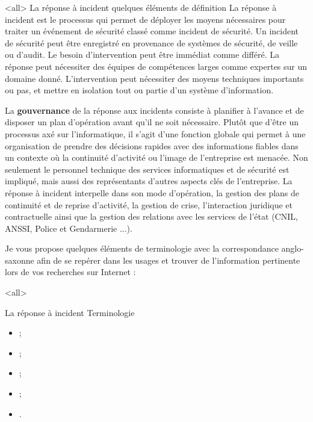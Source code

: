 \mode<all>{\texframe
{La réponse à incident}
{quelques éléments de définition}
{%
La réponse à incident est le processus qui permet de déployer les moyens nécessaires pour traiter un événement de sécurité classé comme incident de sécurité.
Un incident de sécurité peut être enregistré en provenance de systèmes de sécurité, de veille ou d'audit. Le besoin d'intervention peut être immédiat comme différé.
La réponse peut nécessiter des équipes de compétences larges comme expertes sur un domaine donné. L'intervention peut nécessiter des moyens techniques importants ou pas, et mettre en isolation tout ou partie d'un système d'information.
}} %




La \textbf{gouvernance} de la réponse aux incidents consiste à planifier à l'avance et  de disposer un plan d'opération avant qu'il ne soit nécessaire. Plutôt que d'être un processus axé sur l'informatique, il s'agit d'une fonction  globale qui permet à une organisation de prendre des décisions rapides avec des informations fiables dans un contexte où la continuité d'activité ou l'image de l'entreprise est menacée. Non seulement le personnel technique des services informatiques et de sécurité est impliqué, mais aussi des représentants d'autres aspects clés de l'entreprise. La réponse à incident  interpelle  dans son mode d'opération, la gestion des plans de continuité et de reprise d'activité, la gestion de crise,  l'interaction juridique et contractuelle  ainsi que la gestion des relations avec les services de l'état (CNIL, ANSSI, Police et Gendarmerie ...). 

Je vous propose quelques éléments de terminologie avec la correspondance anglo-saxonne afin de se repérer dans les usages et trouver de l'information pertinente lors de vos recherches sur Internet :


\mode<all>{\texframe
{La réponse à incident}
{Terminologie}
{%
\begin{itemize}
		\item {};
		\item{};
		\item {};
		\item {};
		\item {}.
\end{itemize}
}} %

